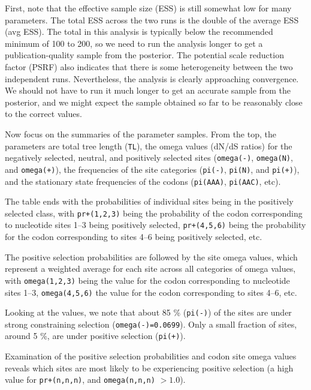 \documentclass[12pt]{book}
\newcommand{\ttt}[1]{\texttt{#1}}
\begin{document}
First, note that the effective sample size (ESS) is still somewhat low for many parameters. The
total ESS across the two runs is the double of the average ESS (avg ESS). The total in this
analysis is typically below the recommended minimum of 100 to 200, so we need to run the analysis
longer to get a publication-quality sample from the posterior. The potential scale reduction factor
(PSRF) also indicates that there is some heterogeneity between the two independent runs.
Nevertheless, the analysis is clearly approaching convergence. We should not have to run it much
longer to get an accurate sample from the posterior, and we might expect the sample obtained so far
to be reasonably close to the correct values.

Now focus on the summaries of the parameter samples. From the top, the parameters are total tree
length (\texttt{TL}), the omega values (dN/dS ratios) for the negatively selected, neutral, and
positively selected sites (\texttt{omega(-)}, \texttt{omega(N)}, and \texttt{omega(+)}), the frequencies
of the site categories (\texttt{pi(-)}, \texttt{pi(N)}, and \texttt{pi(+)}), and the stationary state
frequencies of the codons (\texttt{pi(AAA)}, \texttt{pi(AAC)}, etc).

The table ends with the probabilities of individual sites being in the positively selected class,
with \texttt{pr+(1,2,3)} being the probability of the codon corresponding to nucleotide sites 1--3
being positively selected, \texttt{pr+(4,5,6)} being the probability for the codon corresponding to
sites 4--6 being positively selected, etc.

The positive selection probabilities are followed by the site omega values, which represent a
weighted average for each site across all categories of omega values, with \texttt{omega(1,2,3)} being
the value for the codon corresponding to nucleotide sites 1--3, \texttt{omega(4,5,6)} the value for
the codon corresponding to sites 4--6, etc.

Looking at the values, we note that about 85 \% (\texttt{pi(-)}) of the sites are under strong
constraining selection (\texttt{omega(-)=0.0699}). Only a small fraction of sites, around 5 \%, are
under positive selection (\texttt{pi(+)}).

Examination of the positive selection probabilities and codon site omega values reveals which sites
are most likely to be experiencing positive selection (a high value for \texttt{pr+(n,n,n)}, and
\texttt{omega(n,n,n)} $> 1.0$).
\end{document}
